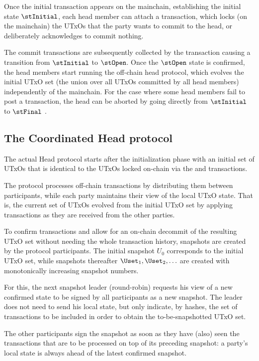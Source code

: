 

Once the initial transaction appears on the mainchain, establishing the initial
state $\stInitial$, each head member can attach a \mtxCom{} transaction, which
locks (on the mainchain) the UTxOs that the party wants to commit to the head,
or deliberately acknowledges to commit nothing.

The commit transactions are subsequently collected by the \mtxCCom{} transaction
causing a transition from $\stInitial$ to $\stOpen$. Once the $\stOpen$ state is
confirmed, the head members start running the off-chain head protocol, which
evolves the initial UTxO set (the union over all UTxOs committed by all head
members) independently of the mainchain. For the case where some head members
fail to post a \mtxCom{} transaction, the head can be aborted by going directly
from $\stInitial$ to $\stFinal$ .


\subsection{The Coordinated Head protocol}

The actual Head protocol starts after the initialization phase with an initial
set of UTxOs that is identical to the UTxOs locked on-chain via the \mtxCom{}
and \mtxCCom{} transactions.

The protocol processes off-chain transactions by distributing them between participants,
while each party maintains their view of the local UTxO state. That is, the current
set of UTxOs evolved from the initial UTxO set by applying transactions as they
are received from the other parties.

To confirm transactions and allow for an on-chain decommit of the resulting UTxO
set without needing the whole transaction history, snapshots are created by the
protocol participants. The initial snapshot $U_{0}$ corresponds to the initial
UTxO set, while snapshots thereafter $\Uset_1,\Uset_2,\ldots$ are created with
monotonically increasing snapshot numbers.

For this, the next snapshot leader (round-robin) requests his view of a new confirmed state to be
signed by all participants as a new snapshot. The leader does not need to send his local state,
but only indicate, by hashes, the set of transactions to be included in order to
obtain the to-be-snapshotted UTxO set.

The other participants sign the snapshot as soon as they have (also) seen the
transactions that are to be processed on top of its preceding snapshot: a
party's local state is always ahead of the latest confirmed snapshot.

